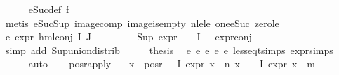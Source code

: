 \begin{isabellebody}
\ \ \ \ \isamarkupfalse%
\ eSuc{\isacharunderscore}{\kern0pt}def\ f{}{\isacharparenleft}{\kern0pt}{}{\isacharparenright}{\kern0pt}\isanewline
\ \ \ \ \isamarkupfalse%
\ {\isacharparenleft}{\kern0pt}metis\ eSuc{\isacharunderscore}{\kern0pt}Sup\ image{\isacharunderscore}{\kern0pt}comp\ image{\isacharunderscore}{\kern0pt}is{\isacharunderscore}{\kern0pt}empty\ nle{\isacharunderscore}{\kern0pt}le\ one{\isacharunderscore}{\kern0pt}eSuc\ zero{\isacharunderscore}{\kern0pt}le{\isacharparenright}{\kern0pt}\ \isanewline
\ \ \ \ \isamarkupfalse%
\ e{}{\isacharcolon}{\kern0pt}\ {\isachardoublequoteopen}expr{\isacharunderscore}{\kern0pt}{}\ {\isacharparenleft}{\kern0pt}hml{\isacharunderscore}{\kern0pt}conj\ I\ J\ {\isasymPhi}{\isacharparenright}{\kern0pt}\ {\isasymle}\ {}{\isachardoublequoteclose}\isanewline
\ \ \ \ \isamarkupfalse%
\ {\isacartoucheopen}Sup\ {\isacharparenleft}{\kern0pt}{\isacharparenleft}{\kern0pt}expr{\isacharunderscore}{\kern0pt}{}\ {\isasymcirc}\ {\isasymPhi}{\isacharparenright}{\kern0pt}\ {\isacharbackquote}{\kern0pt}\ I{\isacharparenright}{\kern0pt}\ {\isasymle}\ {}{\isacartoucheclose}\ expr{\isacharunderscore}{\kern0pt}{}{\isacharunderscore}{\kern0pt}conj\ \isanewline
\ \ \ \ \isamarkupfalse%
\ {\isacharparenleft}{\kern0pt}simp\ add{\isacharcolon}{\kern0pt}\ Sup{\isacharunderscore}{\kern0pt}union{\isacharunderscore}{\kern0pt}distrib{\isacharparenright}{\kern0pt}\isanewline
\ \ \isamarkupfalse%
\ \isamarkupfalse%
\ {\isacharquery}{\kern0pt}thesis\ \isamarkupfalse%
\ e{}\ e{}\ e{}\ e{}\ e{}\ less{\isacharunderscore}{\kern0pt}eq{\isacharunderscore}{\kern0pt}t{\isachardot}{\kern0pt}simps\ expr{\isachardot}{\kern0pt}simps\ \isanewline
\ \ \ \ \isamarkupfalse%
\ auto\isanewline
\ \ \isamarkupfalse%
\isanewline
{}\isamarkupfalse%
%
\endisatagproof
{\isafoldproof}%
%
\isadelimproof
\isanewline
%
\endisadelimproof
\isanewline
{}\isamarkupfalse%
\ pos{\isacharunderscore}{\kern0pt}r{\isacharunderscore}{\kern0pt}apply{\isacharcolon}{\kern0pt}\isanewline
\ \ \ {\isachardoublequoteopen}{\isasymforall}x\ {\isasymin}\ {\isacharparenleft}{\kern0pt}pos{\isacharunderscore}{\kern0pt}r\ {\isacharparenleft}{\kern0pt}{\isasymPhi}\ {\isacharbackquote}{\kern0pt}\ I{\isacharparenright}{\kern0pt}{\isacharparenright}{\kern0pt}{\isachardot}{\kern0pt}\ expr{\isacharunderscore}{\kern0pt}{}\ x\ {\isasymle}\ n{\isachardoublequoteclose}\ {\isachardoublequoteopen}{\isasymforall}x\ {\isasymin}\ {\isasymPhi}\ {\isacharbackquote}{\kern0pt}\ I{\isachardot}{\kern0pt}\ expr{\isacharunderscore}{\kern0pt}{}\ x\ {\isasymle}\ m{\isachardoublequoteclose}\isanewline

\end{isabellebody}

